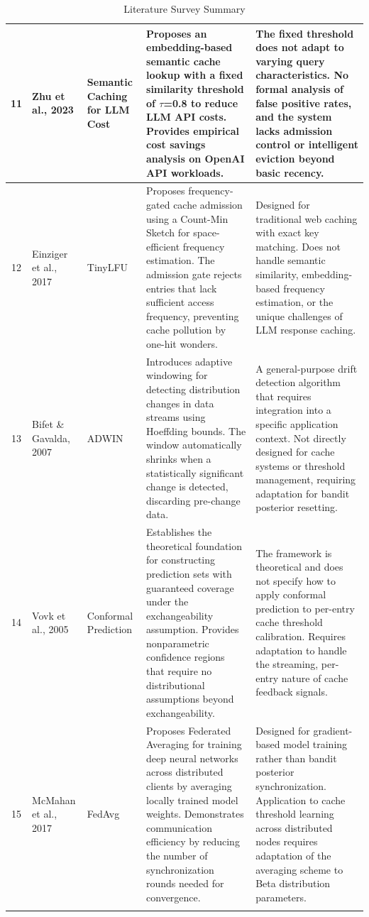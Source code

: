 \documentclass[12pt,a4paper]{report}
\begin{document}
\begin{longtable}{|c|p{2.5cm}|p{2.5cm}|p{4cm}|p{4cm}|}
\hline
11 & Zhu et al., 2023 & Semantic Caching for LLM Cost & Proposes an embedding-based semantic cache lookup with a fixed similarity threshold of $\tau$=0.8 to reduce LLM API costs. Provides empirical cost savings analysis on OpenAI API workloads. & The fixed threshold does not adapt to varying query characteristics. No formal analysis of false positive rates, and the system lacks admission control or intelligent eviction beyond basic recency. \\
\hline
12 & Einziger et al., 2017 & TinyLFU & Proposes frequency-gated cache admission using a Count-Min Sketch for space-efficient frequency estimation. The admission gate rejects entries that lack sufficient access frequency, preventing cache pollution by one-hit wonders. & Designed for traditional web caching with exact key matching. Does not handle semantic similarity, embedding-based frequency estimation, or the unique challenges of LLM response caching. \\
\hline
13 & Bifet \& Gavalda, 2007 & ADWIN & Introduces adaptive windowing for detecting distribution changes in data streams using Hoeffding bounds. The window automatically shrinks when a statistically significant change is detected, discarding pre-change data. & A general-purpose drift detection algorithm that requires integration into a specific application context. Not directly designed for cache systems or threshold management, requiring adaptation for bandit posterior resetting. \\
\hline
14 & Vovk et al., 2005 & Conformal Prediction & Establishes the theoretical foundation for constructing prediction sets with guaranteed coverage under the exchangeability assumption. Provides nonparametric confidence regions that require no distributional assumptions beyond exchangeability. & The framework is theoretical and does not specify how to apply conformal prediction to per-entry cache threshold calibration. Requires adaptation to handle the streaming, per-entry nature of cache feedback signals. \\
\hline
15 & McMahan et al., 2017 & FedAvg & Proposes Federated Averaging for training deep neural networks across distributed clients by averaging locally trained model weights. Demonstrates communication efficiency by reducing the number of synchronization rounds needed for convergence. & Designed for gradient-based model training rather than bandit posterior synchronization. Application to cache threshold learning across distributed nodes requires adaptation of the averaging scheme to Beta distribution parameters. \\
\hline
\caption{Literature Survey Summary} \label{tab:litsurvey}
\end{longtable}
\end{document}
